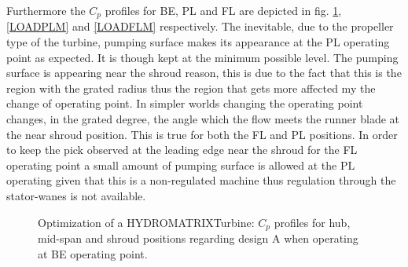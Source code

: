 Furthermore the $C_p$ profiles for BE, PL and FL are depicted in fig. \ref{LOADBEM},\ref{LOADPLM} and \ref{LOADFLM} respectively. The inevitable, due to the propeller type of the turbine, pumping surface makes its appearance at the PL operating point as expected. It is though kept at the minimum possible level. The pumping surface is appearing near the shroud reason, this is due to the fact that this is the region with the grated radius thus the region that gets more affected my the change of operating point. In simpler worlds changing the operating point changes, in the grated degree, the angle which the flow meets the runner blade at the near shroud position. This is true for both the FL and PL positions. In order to keep the pick observed at the leading edge near the shroud for the FL operating point a small amount of pumping surface is allowed at the PL operating given that this is a non-regulated machine thus regulation through the stator-wanes is not available.           


\begin{figure}[h!]
\begin{minipage}[b]{1\linewidth}
 \centering
\end{minipage}
\caption{Optimization of a HYDROMATRIX\circledR Turbine: $C_p$ profiles for hub, mid-span and shroud positions regarding design A when operating at BE operating point.}
\label{LOADBEM}
\end{figure}

